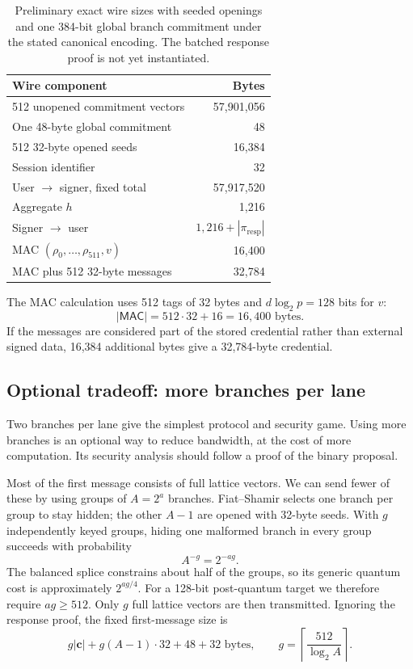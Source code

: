 \documentclass[10pt]{article}
\begin{document}
\begin{table}[htbp]
\centering
\begin{tabular}{lr}
\toprule
Wire component & Bytes \\
\midrule
512 unopened commitment vectors & 57,901,056 \\
One 48-byte global commitment & 48 \\
512 32-byte opened seeds & 16,384 \\
Session identifier & 32 \\
User $\rightarrow$ signer, fixed total & 57,917,520 \\
Aggregate $h$ & 1,216 \\
Signer $\rightarrow$ user & $1,216+|\pi_{\mathrm{resp}}|$ \\
MAC $(\rho_0,\ldots,\rho_{511},v)$ & 16,400 \\
MAC plus 512 32-byte messages & 32,784 \\
\bottomrule
\end{tabular}
\caption{Preliminary exact wire sizes with seeded openings and one 384-bit
global branch commitment under the stated canonical encoding.
The batched response proof is not yet instantiated.}
\label{tab:wire-size}
\end{table}

The MAC calculation uses 512 tags of 32 bytes and
$d\log_2p=128$ bits for $v$:
\[
 |\mathsf{MAC}|=512\cdot32+16=16{,}400\text{ bytes}.
\]
If the messages are considered part of the stored credential rather than
external signed data, 16,384 additional bytes give a 32,784-byte credential.

\subsection{Optional tradeoff: more branches per lane}

Two branches per lane give the simplest protocol and security game.  Using
more branches is an optional way to reduce bandwidth, at the cost of more
computation.  Its security analysis should follow a proof of the binary
proposal.

Most of the first message consists of full lattice vectors.  We can send
fewer of these by using groups of $A=2^a$ branches.  Fiat--Shamir selects one
branch per group to stay hidden; the other $A-1$ are opened with 32-byte
seeds.  With $g$ independently keyed groups, hiding one malformed branch in
every group succeeds with probability
\[
 A^{-g}=2^{-ag}.
\]
The balanced splice constrains about half of the groups, so its generic quantum
cost is approximately $2^{ag/4}$.  For a 128-bit post-quantum target we
therefore require $ag\geq512$.  Only $g$ full lattice vectors are then
transmitted.  Ignoring
the response proof, the fixed first-message size is
\[
 g|\mathbf c|+g(A-1)\cdot32+48+32\text{ bytes},
 \qquad g=\left\lceil\frac{512}{\log_2 A}\right\rceil.
\]
\end{document}

